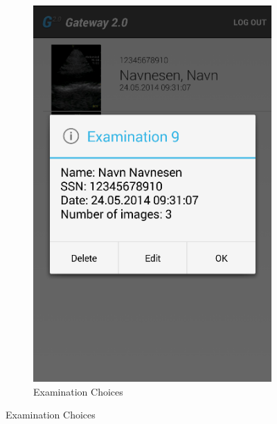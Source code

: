 \begin{figure}[H]
\begin{subfigure}[b]{0.49\textwidth}
        \includegraphics[width=\textwidth]{img/interface/11-DeleteExamination.png}
        \caption*{Examination Choices}
        \label{fig:12delete}
    \end{subfigure}
\end{figure}

